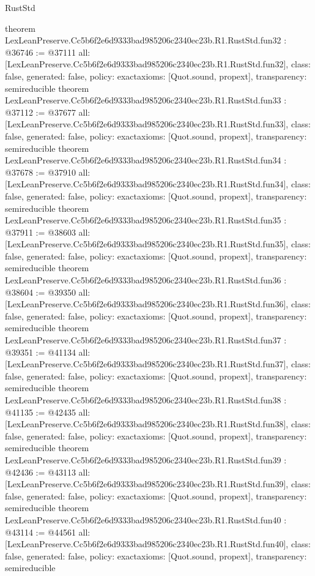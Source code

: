 \begin{lexlean}{RustStd}
\begin{coremodule}
{}
theorem LexLeanPreserve.Cc5b6f2e6d9333bad985206c2340ec23b.R1.RustStd.fun32 : @36746 := @37111 {
  all: [LexLeanPreserve.Cc5b6f2e6d9333bad985206c2340ec23b.R1.RustStd.fun32],
  class: false,
  generated: false,
  policy: exact{axioms: [Quot.sound, propext]},
  transparency: semireducible
}
theorem LexLeanPreserve.Cc5b6f2e6d9333bad985206c2340ec23b.R1.RustStd.fun33 : @37112 := @37677 {
  all: [LexLeanPreserve.Cc5b6f2e6d9333bad985206c2340ec23b.R1.RustStd.fun33],
  class: false,
  generated: false,
  policy: exact{axioms: [Quot.sound, propext]},
  transparency: semireducible
}
theorem LexLeanPreserve.Cc5b6f2e6d9333bad985206c2340ec23b.R1.RustStd.fun34 : @37678 := @37910 {
  all: [LexLeanPreserve.Cc5b6f2e6d9333bad985206c2340ec23b.R1.RustStd.fun34],
  class: false,
  generated: false,
  policy: exact{axioms: [Quot.sound, propext]},
  transparency: semireducible
}
theorem LexLeanPreserve.Cc5b6f2e6d9333bad985206c2340ec23b.R1.RustStd.fun35 : @37911 := @38603 {
  all: [LexLeanPreserve.Cc5b6f2e6d9333bad985206c2340ec23b.R1.RustStd.fun35],
  class: false,
  generated: false,
  policy: exact{axioms: [Quot.sound, propext]},
  transparency: semireducible
}
theorem LexLeanPreserve.Cc5b6f2e6d9333bad985206c2340ec23b.R1.RustStd.fun36 : @38604 := @39350 {
  all: [LexLeanPreserve.Cc5b6f2e6d9333bad985206c2340ec23b.R1.RustStd.fun36],
  class: false,
  generated: false,
  policy: exact{axioms: [Quot.sound, propext]},
  transparency: semireducible
}
theorem LexLeanPreserve.Cc5b6f2e6d9333bad985206c2340ec23b.R1.RustStd.fun37 : @39351 := @41134 {
  all: [LexLeanPreserve.Cc5b6f2e6d9333bad985206c2340ec23b.R1.RustStd.fun37],
  class: false,
  generated: false,
  policy: exact{axioms: [Quot.sound, propext]},
  transparency: semireducible
}
theorem LexLeanPreserve.Cc5b6f2e6d9333bad985206c2340ec23b.R1.RustStd.fun38 : @41135 := @42435 {
  all: [LexLeanPreserve.Cc5b6f2e6d9333bad985206c2340ec23b.R1.RustStd.fun38],
  class: false,
  generated: false,
  policy: exact{axioms: [Quot.sound, propext]},
  transparency: semireducible
}
theorem LexLeanPreserve.Cc5b6f2e6d9333bad985206c2340ec23b.R1.RustStd.fun39 : @42436 := @43113 {
  all: [LexLeanPreserve.Cc5b6f2e6d9333bad985206c2340ec23b.R1.RustStd.fun39],
  class: false,
  generated: false,
  policy: exact{axioms: [Quot.sound, propext]},
  transparency: semireducible
}
theorem LexLeanPreserve.Cc5b6f2e6d9333bad985206c2340ec23b.R1.RustStd.fun40 : @43114 := @44561 {
  all: [LexLeanPreserve.Cc5b6f2e6d9333bad985206c2340ec23b.R1.RustStd.fun40],
  class: false,
  generated: false,
  policy: exact{axioms: [Quot.sound, propext]},
  transparency: semireducible
}
\end{coremodule}
\end{lexlean}
